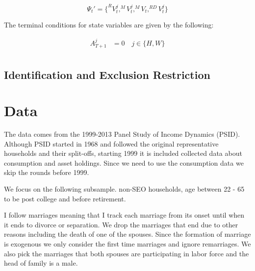 \begin{equation*}
\Psi_t'  =\{ ^{R}V_t^j, ^MV^j_t, ^{M}V_t, ^{RD}V_t^j\}
\end{equation*}

\noindent The terminal conditions for state variables are given by the following: 

\begin{align*}
A_{T+1}^j &= 0  \quad j \in \{H, W\} \\ 
\end{align*}

\subsection{Identification and Exclusion Restriction}

\section{Data}
The data comes from the 1999-2013 Panel Study of Income Dynamics (PSID). Although PSID started in 1968 and followed the original representative households and their split-offs, starting 1999 it is included collected data about consumption and asset holdings. Since we need to use the consumption data we skip the rounds before 1999. 

We focus on the following subsample. non-SEO households, age between 22 - 65 to be post college and before retirement. 

I follow marriages meaning that I track each marriage from its onset until when it ends to divorce or separation. We drop the marriages that end due to other reasons including the death of one of the spouses. Since the formation of marriage is exogenous we only consider the first time marriages and ignore remarriages.  We also pick the marriages that both spouses are participating in labor force and the head of family is a male.\\




\clearpage




